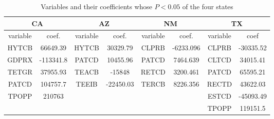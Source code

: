 \begin{table}[H]
\centering

\caption{Variables and their coefficients whose $P<0.05$ of the four states}
\label{table: var and coef}
    \begin{threeparttable}
        \begin{tabular}{cccccccc}
        \toprule
\multicolumn{2}{c}{CA} & \multicolumn{2}{c}{AZ} & \multicolumn{2}{c}{NM} & \multicolumn{2}{c}{TX} \\
\midrule
variable & coef.     & variable & coef.     & variable & coef.     & variable & coef      \\
HYTCB    & 66649.39  & HYTCB    & 30329.79  & CLPRB    & -6233.096 & CLPRB    & -30335.52 \\
GDPRX    & -113341.8 & PATCD    & 10455.96  & PATCD    & 7464.639  & CLTCD    & 34015.41  \\
TETGR    & 37955.93  & TEACB    & -15848    & RETCD    & 3200.461  & PATCD    & 65595.21  \\
PATCD    & 104757.7  & TEEIB    & -22450.03 & TERCB    & 8226.356  & RECTD    & 43622.03  \\
TPOPP    & 210763    &          &           &          &           & ESTCD    & -45093.49 \\
         &           &          &           &          &           & TPOPP    & 119151.5   \\
         \bottomrule
\end{tabular}
    \end{threeparttable}
    
\end{table}